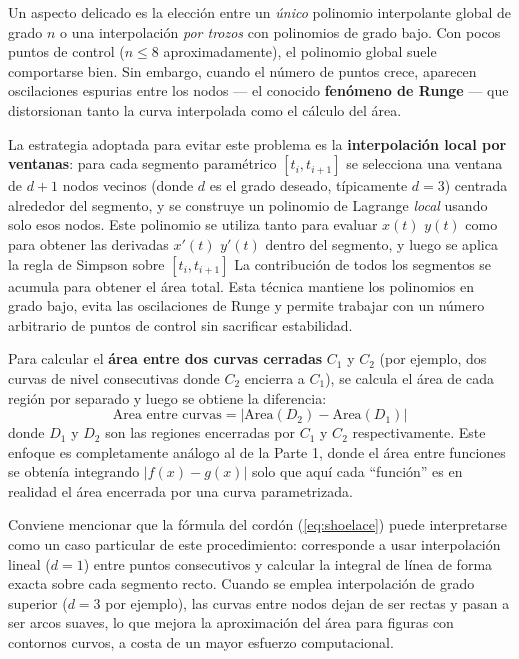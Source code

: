 \documentclass[12pt]{article}
\begin{document}
\begin{enumerate}
	Un aspecto delicado es la elección entre un \textit{único} polinomio interpolante global de grado $n$ o una interpolación \textit{por trozos} con polinomios de grado bajo. Con pocos puntos de control ($n \leq 8$ aproximadamente), el polinomio global suele comportarse bien. Sin embargo, cuando el número de puntos crece, aparecen oscilaciones espurias entre los nodos --- el conocido \textbf{fenómeno de Runge} \cite{cheney08} --- que distorsionan tanto la curva interpolada como el cálculo del área.

	La estrategia adoptada para evitar este problema es la \textbf{interpolación local por ventanas}: para cada segmento paramétrico $[t_i, t_{i+1}]$ se selecciona una ventana de $d+1$ nodos vecinos (donde $d$ es el grado deseado, típicamente $d=3$) centrada alrededor del segmento, y se construye un polinomio de Lagrange \textit{local} usando solo esos nodos. Este polinomio se utiliza tanto para evaluar $x(t)$ $y(t)$ como para obtener las derivadas $x'(t)$ $y'(t)$ dentro del segmento, y luego se aplica la regla de Simpson sobre $[t_i, t_{i+1}]$ La contribución de todos los segmentos se acumula para obtener el área total. Esta técnica mantiene los polinomios en grado bajo, evita las oscilaciones de Runge y permite trabajar con un número arbitrario de puntos de control sin sacrificar estabilidad.

	Para calcular el \textbf{área entre dos curvas cerradas} $C_1$ y $C_2$ (por ejemplo, dos curvas de nivel consecutivas donde $C_2$ encierra a $C_1$), se calcula el área de cada región por separado y luego se obtiene la diferencia:
	\[
	\text{Area entre curvas} = \bigl|\text{Area}(D_2) - \text{Area}(D_1)\bigr|
	\]
	donde $D_1$ y $D_2$ son las regiones encerradas por $C_1$ y $C_2$ respectivamente. Este enfoque es completamente análogo al de la Parte 1, donde el área entre funciones se obtenía integrando $|f(x) - g(x)|$ solo que aquí cada ``función'' es en realidad el área encerrada por una curva parametrizada.

	Conviene mencionar que la fórmula del cordón (\ref{eq:shoelace}) puede interpretarse como un caso particular de este procedimiento: corresponde a usar interpolación lineal ($d=1$) entre puntos consecutivos y calcular la integral de línea de forma exacta sobre cada segmento recto. Cuando se emplea interpolación de grado superior ($d=3$ por ejemplo), las curvas entre nodos dejan de ser rectas y pasan a ser arcos suaves, lo que mejora la aproximación del área para figuras con contornos curvos, a costa de un mayor esfuerzo computacional.
\end{enumerate}
\end{document}
